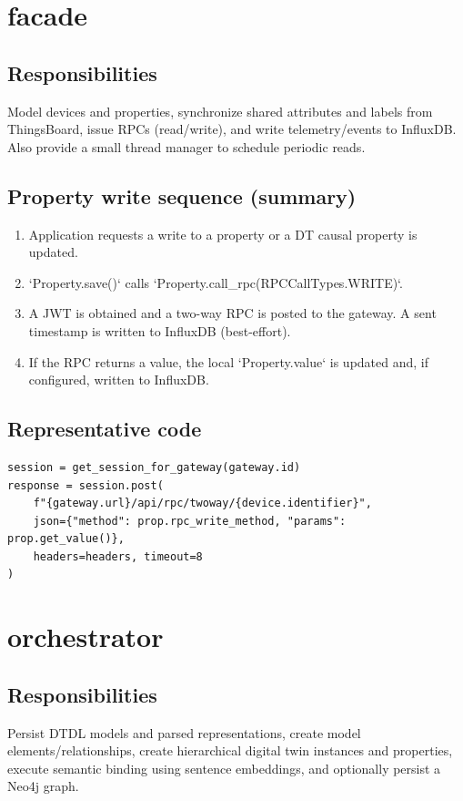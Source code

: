 \documentclass[11pt]{article}
\begin{document}
\section{facade}
\subsection*{Responsibilities}
Model devices and properties, synchronize shared attributes and labels from ThingsBoard, issue RPCs (read/write), and write telemetry/events to InfluxDB. Also provide a small thread manager to schedule periodic reads.

\subsection*{Property write sequence (summary)}
\begin{enumerate}
  \item Application requests a write to a property or a DT causal property is updated.
  \item `Property.save()` calls `Property.call_rpc(RPCCallTypes.WRITE)`.
  \item A JWT is obtained and a two-way RPC is posted to the gateway. A sent timestamp is written to InfluxDB (best-effort).
  \item If the RPC returns a value, the local `Property.value` is updated and, if configured, written to InfluxDB.
\end{enumerate}

\subsection*{Representative code}
\begin{lstlisting}
session = get_session_for_gateway(gateway.id)
response = session.post(
    f"{gateway.url}/api/rpc/twoway/{device.identifier}",
    json={"method": prop.rpc_write_method, "params": prop.get_value()},
    headers=headers, timeout=8
)
\end{lstlisting}

\section{orchestrator}
\subsection*{Responsibilities}
Persist DTDL models and parsed representations, create model elements/relationships, create hierarchical digital twin instances and properties, execute semantic binding using sentence embeddings, and optionally persist a Neo4j graph.
\end{document}

